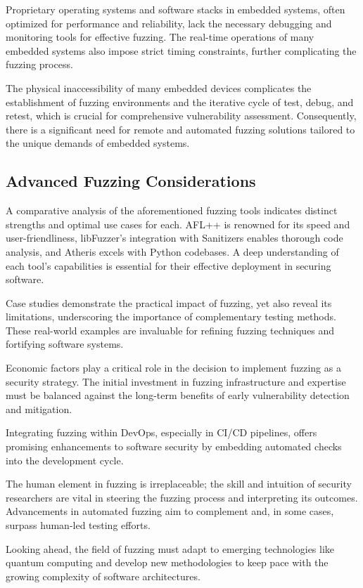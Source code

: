 Proprietary operating systems and software stacks in embedded systems, often
optimized for performance and reliability, lack the necessary debugging and
monitoring tools for effective fuzzing. The real-time operations of many
embedded systems also impose strict timing constraints, further complicating the
fuzzing process.

The physical inaccessibility of many embedded devices complicates the
establishment of fuzzing environments and the iterative cycle of test, debug,
and retest, which is crucial for comprehensive vulnerability assessment.
Consequently, there is a significant need for remote and automated fuzzing
solutions tailored to the unique demands of embedded systems.

\subsection*{Advanced Fuzzing Considerations}

A comparative analysis of the aforementioned fuzzing tools indicates distinct
strengths and optimal use cases for each. AFL++ is renowned for its speed and
user-friendliness, libFuzzer's integration with Sanitizers enables thorough code
analysis, and Atheris excels with Python codebases. A deep understanding of each
tool's capabilities is essential for their effective deployment in securing
software.

Case studies demonstrate the practical impact of fuzzing, yet also reveal its
limitations, underscoring the importance of complementary testing methods. These
real-world examples are invaluable for refining fuzzing techniques and
fortifying software systems.

Economic factors play a critical role in the decision to implement fuzzing as a
security strategy. The initial investment in fuzzing infrastructure and
expertise must be balanced against the long-term benefits of early vulnerability
detection and mitigation.

Integrating fuzzing within DevOps, especially in CI/CD pipelines, offers
promising enhancements to software security by embedding automated checks into
the development cycle.


The human element in fuzzing is irreplaceable; the skill and intuition of
security researchers are vital in steering the fuzzing process and interpreting
its outcomes. Advancements in automated fuzzing aim to complement and, in some
cases, surpass human-led testing efforts.


Looking ahead, the field of fuzzing must adapt to emerging technologies like
quantum computing and develop new methodologies to keep pace with the growing
complexity of software architectures.

